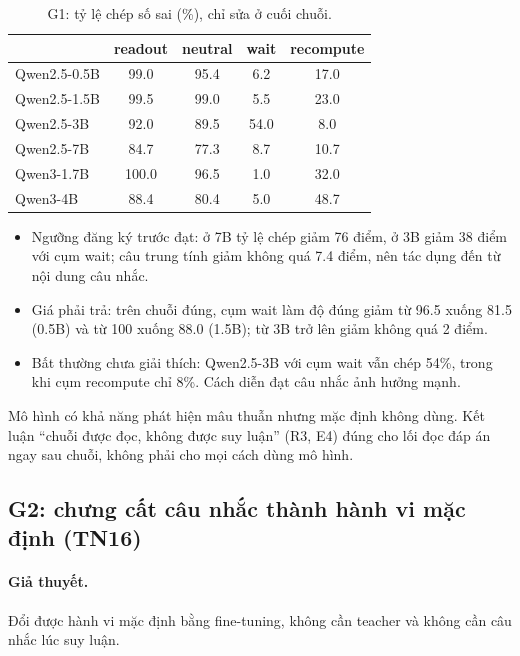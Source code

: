 \documentclass[11pt]{article}
\begin{document}
\begin{table}[h]
\centering\small
\caption{G1: tỷ lệ chép số sai (\%), chỉ sửa ở cuối chuỗi.}
\begin{tabular}{lcccc}
\toprule
 & readout & neutral & wait & recompute \\
\midrule
Qwen2.5-0.5B & 99.0 & 95.4 & 6.2 & 17.0 \\
Qwen2.5-1.5B & 99.5 & 99.0 & 5.5 & 23.0 \\
Qwen2.5-3B & 92.0 & 89.5 & 54.0 & 8.0 \\
Qwen2.5-7B & 84.7 & 77.3 & 8.7 & 10.7 \\
Qwen3-1.7B & 100.0 & 96.5 & 1.0 & 32.0 \\
Qwen3-4B & 88.4 & 80.4 & 5.0 & 48.7 \\
\bottomrule
\end{tabular}
\end{table}

\begin{cachdoc}
\begin{itemize}[leftmargin=*,itemsep=1pt]
\item Ngưỡng đăng ký trước đạt: ở 7B tỷ lệ chép giảm 76 điểm, ở 3B giảm 38 điểm với cụm wait; câu trung tính
  giảm không quá 7.4 điểm, nên tác dụng đến từ nội dung câu nhắc.
\item Giá phải trả: trên chuỗi đúng, cụm wait làm độ đúng giảm từ 96.5 xuống 81.5 (0.5B) và từ 100 xuống 88.0
  (1.5B); từ 3B trở lên giảm không quá 2 điểm.
\item Bất thường chưa giải thích: Qwen2.5-3B với cụm wait vẫn chép 54\%, trong khi cụm recompute chỉ 8\%.
  Cách diễn đạt câu nhắc ảnh hưởng mạnh.
\end{itemize}
\end{cachdoc}

\begin{ketluan}
Mô hình có khả năng phát hiện mâu thuẫn nhưng mặc định không dùng. Kết luận ``chuỗi được đọc, không được
suy luận'' (R3, E4) đúng cho lối đọc đáp án ngay sau chuỗi, không phải cho mọi cách dùng mô hình.
\end{ketluan}

\subsection{G2: chưng cất câu nhắc thành hành vi mặc định (TN16)}

\paragraph{Giả thuyết.} Đổi được hành vi mặc định bằng fine-tuning, không cần teacher và không cần câu nhắc
lúc suy luận.
\end{document}
